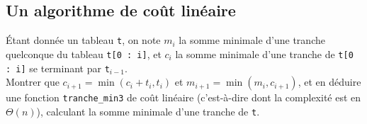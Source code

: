 \subsection*{Un algorithme de coût linéaire}
 
Étant donnée un tableau \texttt{t}, on note $m_i$ la somme minimale d'une tranche quelconque du 
tableau \texttt{t[0 : i]}, et $c_i$ la somme minimale d'une tranche de \texttt{t[0 : i]} se 
terminant par \texttt{t$_{i-1}$}.\\
 
Montrer que $c_{i+1} = \min(c_i + t_i , t_i )$ et $m_{i+1} = \min(m_i , c_{i+1})$, et en déduire 
une fonction \texttt{tranche\_min3} de coût linéaire (c'est-à-dire dont la complexité est en 
$\Theta(n)$), calculant la somme minimale d'une tranche de \texttt{t}.